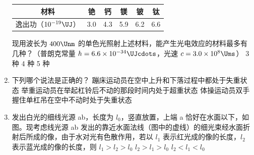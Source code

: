 \documentclass[\gkver]{gaokaozhenti}
\begin{document}
\begin{enumerate}
\begin{center}
\begin{tabular}{|c|c|c|c|c|c|}
\hline
材料 & 铯 & 钙 & 镁 & 铍 & 钛 \\
\hline
逸出功（$10^{-19}\UJ$） & 3.0 & 4.3 & 5.9 & 6.2 & 6.6 \\
\hline
\end{tabular}
\end{center}

现用波长为 $400\Unm$ 的单色光照射上述材料，能产生光电效应的材料最多有几种？（普朗克常量 $h=6.6\times10^{-34}\UJcdots$，光速 $c=3.0\times10^{8}\Ums$）
{3 种}
{4 种}
{5 种}


\item
下列哪个说法是正确的？
{蹦床运动员在空中上升和下落过程中都处于失重状态}
{举重运动员在举起杠铃后不动的那段时间内处于超重状态}
{体操运动员双手握住单杠吊在空中不动时处于失重状态}


\item
发出白光的细线光源 ab，长度为 $l_{0}$，竖直放置，上端 a 恰好在水面以下，如图。现考虑线光源 ab 发出的靠近水面法线（图中的虚线）的细光束经水面折射后所成的像，由于水对光有色散作用，若以 $l_{1}$ 表示红光成的像的长度，$l_{2}$ 表示蓝光成的像的长度，则
{$l_{1}>l_{2}>l_{0}$}
{$l_{2}>l_{1}>l_{0}$}
{$l_{2}<l_{1}<l_{0}$}

\end{enumerate}
\end{document}
